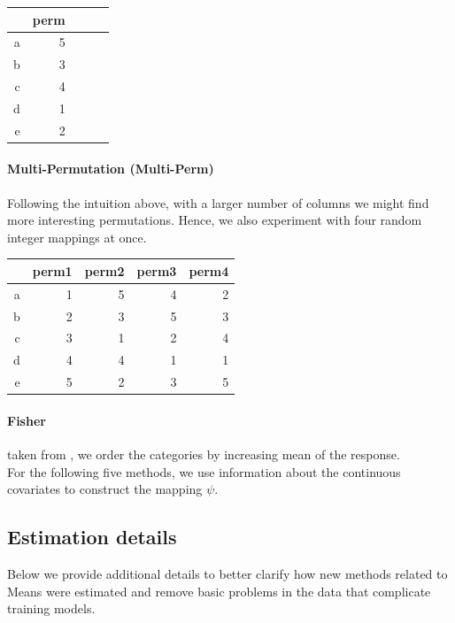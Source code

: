 \documentclass{article}
\theoremstyle{plain}
\theoremstyle{definition}
\theoremstyle{remark}
\begin{document}
\begin{table}[H]
	\centering
	\begin{tabular}{rrrrr}
		\hline
		& perm  \\
		\hline
		a & 5  \\
		b & 3  \\
		c & 4  \\
		d & 1 \\
		e & 2  \\
		\hline
	\end{tabular}
\end{table}



\paragraph{Multi-Permutation (Multi-Perm)} Following the intuition above, with a larger number of columns we might find more interesting permutations. Hence, we also experiment with four random integer mappings at once.

\begin{table}[H]
	\centering
	\begin{tabular}{rrrrr}
		\hline
		& perm1 & perm2 & perm3 & perm4 \\
		\hline
		a & 1 & 5 & 4 & 2 \\
		b & 2 & 3 & 5 & 3 \\
		c & 3 & 1 & 2 & 4 \\
		d & 4 & 4 & 1 & 1 \\
		e & 5 & 2 & 3 & 5 \\
		\hline
	\end{tabular}
\end{table}

\paragraph{Fisher} taken from \cite{hastie2009elements}, we order the categories by increasing mean of the response.\\

For the following five methods, we use information about the continuous covariates to construct the mapping $\psi$.

\subsection{Estimation details}\label{subsec:estim}

Below we provide additional details to better clarify how new methods related to Means were estimated and remove basic problems in the data that complicate training models.
\end{document}
